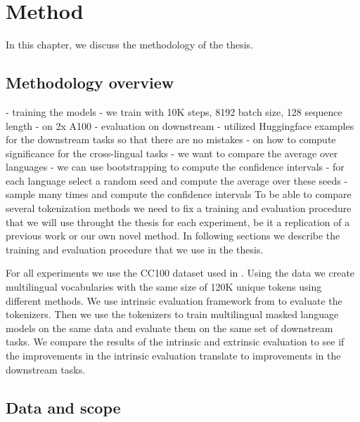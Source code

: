 

\chapter{Method}
\label{chap:method}


In this chapter, we discuss the methodology of the thesis. 

\section{Methodology overview}

- training the models
    - we train with 10K steps, 8192 batch size, 128 sequence length
    - on 2x A100
- evaluation on downstream
    - utilized Huggingface examples for the downstream tasks so that there are no mistakes
    - on how to compute significance for the cross-lingual tasks
        - we want to compare the average over languages
        - we can use bootstrapping to compute the confidence intervals
            - for each language select a random seed and compute the average over these seeds
            - sample many times and compute the confidence intervals
To be able to compare several tokenization methods we need to fix a training and evaluation procedure that we will use throught the thesis for each experiment, be it a replication of a previous work or our own novel method. In following sections we describe the training and evaluation procedure that we use in the thesis.

For all experiments we use the CC100 dataset used in \citet{conneau_unsupervised_2020}. Using the data we create multilingual vocabularies with the same size of 120K unique tokens using different methods. We use intrinsic evaluation framework from \citet{limisiewicz_tokenization_2023} to evaluate the tokenizers. Then we use the tokenizers to train multilingual masked language models on the same data and evaluate them on the same set of downstream tasks. We compare the results of the intrinsic and extrinsic evaluation to see if the improvements in the intrinsic evaluation translate to improvements in the downstream tasks.

\section{Data and scope}

